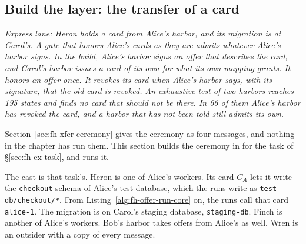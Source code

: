 %
%
\subsection{Build the layer: the transfer of a card}
\label{sec:fh-offer}

\noindent\emph{Express lane: Heron holds a card from Alice's harbor, and
its migration is at Carol's. A gate that honors Alice's cards as they are
admits whatever Alice's harbor signs. In the build, Alice's harbor signs an
offer that describes the card, and Carol's harbor issues a card of its own
for what its own mapping grants. It honors an offer once. It revokes its
card when Alice's harbor says, with its signature, that the old card is
revoked. An exhaustive test of two harbors reaches 195 states and finds no
card that should not be there. In 66 of them Alice's harbor has revoked the
card, and a harbor that has not been told still admits its own.}

Section~\ref{sec:fh-xfer-ceremony} gives the ceremony as four messages, and
nothing in the chapter has run them. This section builds the ceremony in
\pdkernelname{} for the task of \S\ref{sec:fh-ex-task}, and runs it.

The cast is that task's. Heron is one of Alice's workers. Its card $C_A$
lets it write the \texttt{checkout} schema of Alice's test database, which
the runs write as \texttt{test-db/checkout/*}. From
Listing~\ref{alg:fh-offer-run-core} on, the runs call that card
\texttt{alice-1}. The migration is on Carol's staging database,
\texttt{staging-db}. Finch is another of Alice's workers. Bob's harbor takes offers from Alice's as well. Wren is an
outsider with a copy of every message.

